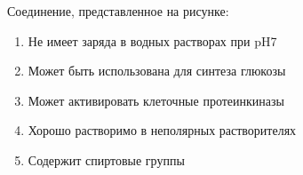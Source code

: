
Соединение, представленное на рисунке:


\begin{enumerate}
    \item Не имеет заряда в водных растворах при pH7 
    \item Может быть использована для синтеза глюкозы
    \item Может активировать клеточные протеинкиназы
    \item Хорошо растворимо в неполярных растворителях
    \item Содержит спиртовые группы	
\end{enumerate}


\explanationSection

